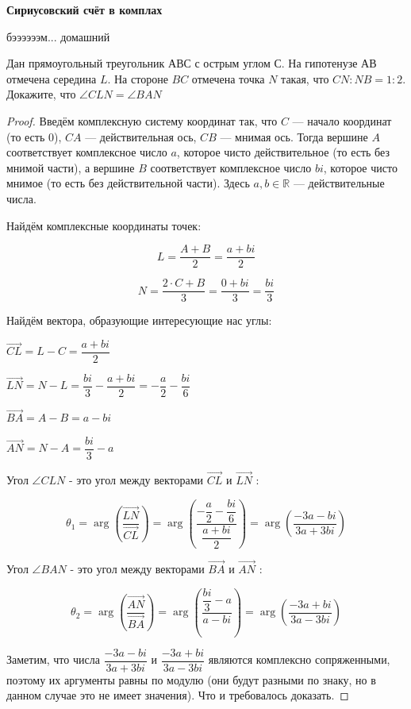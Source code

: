 \centerline{\bf \Huge Сириусовский счёт в комплах}

\begin{flushright}
        \scriptsize{бээээээм... домашний}
\end{flushright}

Дан прямоугольный треугольник $АВС$ с острым углом $С$. На гипотенузе $АВ$ отмечена середина $L$. На стороне $BC$ отмечена точка $N$ такая, что $CN:NB = 1:2.$ Докажите, что $\angle CLN = \angle BAN$

\begin{proof}
    Введём комплексную систему координат так, что $C$ --- начало координат (то есть 0), $CA$ --- действительная ось, $CB$ --- мнимая ось. Тогда вершине $A$ соответствует комплексное число $a$, которое чисто действительное (то есть без мнимой части), а вершине $B$ соответствует комплексное число $bi$, которое чисто мнимое (то есть без действительной части). Здесь $a, b \in \mathbb{R}$ --- действительные числа. 
    
    Найдём комплексные координаты точек:

    $$L = \dfrac{A+B}{2} = \dfrac{a+bi}{2}$$

    $$N = \dfrac{2\cdot C + B}{3} = \dfrac{0 + bi}{3} = \dfrac{bi}{3}$$

    Найдём вектора, образующие интересующие нас углы:

    $\overrightarrow{C L}=L-C=\dfrac{a+b i}{2}$

    $\overrightarrow{L N}=N-L=\dfrac{b i}{3}-\dfrac{a+b i}{2}=-\dfrac{a}{2}-\dfrac{b i}{6}$

    $\overrightarrow{B A}=A-B=a-b i$

    $\overrightarrow{A N}=N-A=\dfrac{b i}{3}-a$

Угол $\angle C L N$ - это угол между векторами $\overrightarrow{C L}$ и $\overrightarrow{L N}$ :

$$
\theta_1=\arg \left(\dfrac{\overrightarrow{L N}}{\overrightarrow{C L}}\right)=\arg \left(\dfrac{-\dfrac{a}{2}-\dfrac{b i}{6}}{\dfrac{a+b i}{2}}\right)=\arg \left(\dfrac{-3 a-b i}{3 a+3 b i}\right)
$$


\newpage

\hspace{3mm}

Угол $\angle B A N$ - это угол между векторами $\overrightarrow{B A}$ и $\overrightarrow{A N}$ :

$$
\theta_2=\arg \left(\dfrac{\overrightarrow{A N}}{\overrightarrow{B A}}\right)=\arg \left(\dfrac{\dfrac{b i}{3}-a}{a-b i}\right)=\arg \left(\dfrac{-3 a+b i}{3 a-3 b i}\right)
$$

Заметим, что числа $\dfrac{-3a - bi}{3a + 3bi}$ и $\dfrac{- 3a + b i}{3a - 3b i}$ являются комплексно сопряженными, поэтому их аргументы равны по модулю (они будут разными по знаку, но в данном случае это не имеет значения). Что и требовалось доказать.

\end{proof}